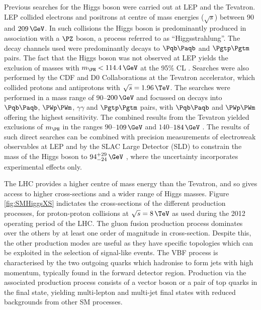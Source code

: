 Previous searches for the Higgs boson were carried out at LEP and the
Tevatron. LEP collided electrons and positrons at centre of mass
energies ($\sqrt{s}$) between $90$ and $209\,\GeV$. In such collisions the Higgs
boson is predominantly produced in association with a $\PZ$ boson, a process
referred to as ``Higgsstrahlung''. The decay channels used were predominantly decays
to $\Pqb\Paqb$ and $\Pgtp\Pgtm$ pairs. The fact that the Higgs boson was not
observed at LEP yields the exclusion of masses with $m_{\PH}<114.4\,\GeV$ at the
95\% \ac{CL} \cite{Barate:2003sz}. Searches were also performed by the CDF and D0 Collaborations at
the Tevatron accelerator, which collided protons and antiprotons with
$\sqrt{s}=1.96\,\TeV$. The searches were performed in a mass range of
$90$--$200\,\GeV$ and focussed on decays into $\Pqb\Paqb$, $\PWp\PWm$,
$\gamma\gamma$ and $\Pgtp\Pgtm$ pairs, with  $\Pqb\Paqb$ and $\PWp\PWm$ offering
the highest sensitivity. The combined results from the Tevatron yielded
exclusions of $m_{\PH}$ in the ranges $90$--$109\,\GeV$ and $140$--$184\,\GeV$
\cite{Aaltonen:2013kxa}. The results of such direct searches
can be combined with precision measurements of electroweak observables at LEP
and by the SLAC Large Detector (SLD) to constrain the mass of the Higgs
boson to $94^{+29}_{-24}\,\GeV$ \cite{lepewwg}, 
where the uncertainty incorporates experimental effects only.

The LHC provides a higher centre of mass energy than the Tevatron, and so
gives access to higher cross-sections and a wider range of Higgs masses. Figure
\ref{fig:SMHiggsXS} indictates the cross-sections of the different production
processes, for proton-proton collisions at $\sqrt{s}=8\,\TeV$ as used during the 
2012 operating period of the LHC. The gluon fusion production process dominates 
over the others by at least one order of magnitude in cross-section. 
Despite this, the other production modes are useful as they have specific 
topologies which can be exploited in the selection of signal-like events. 
The \ac{VBF} process is characterised by the two outgoing quarks which
hadronise to form jets with high momentum, typically found in the forward
detector region. Production via the associated production process consists of a vector
boson or a pair of top quarks in the final state, yielding multi-lepton and 
multi-jet final states with reduced backgrounds from other \ac{SM} processes.

